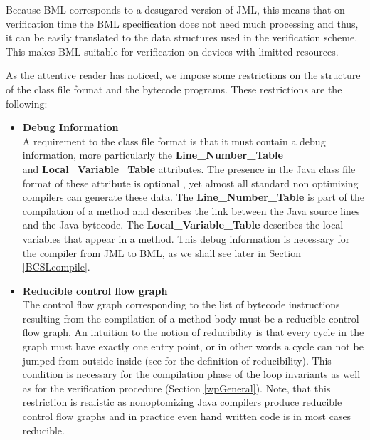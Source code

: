 \begin{itemize}
      Because BML corresponds to a desugared version of JML, this means that on verification time
      the BML specification does not need much processing and thus, it can be easily translated to the
      data structures used in the verification scheme. This makes BML suitable for verification on devices
      with limitted resources.
      
\end{itemize}



As the attentive reader has noticed, we impose some restrictions on the structure of the class file format and the bytecode programs.
These restrictions are the following:
 


\begin{itemize}
  \item \textbf{Debug Information} \\ 
       A requirement to the class file format is that it must contain a debug information, more particularly
       the \textbf{Line\_Number\_Table} \\ 
       and \textbf{Local\_Variable\_Table}  attributes. The presence in the Java class file format of 
       these attribute is optional \cite{VMSpec}, yet almost all standard non optimizing compilers can generate these data. 
       The \textbf{Line\_Number\_Table} is part of the compilation of a method and 
       describes the link between the Java source lines and the Java bytecode.
       The \textbf{Local\_Variable\_Table} describes the local variables that appear in a method.  
       This debug information is necessary for the compiler from JML to BML, as we shall see later in Section \ref{BCSLcompile}.

\item  \textbf{Reducible control flow graph} \\ 
       The control flow graph corresponding to the list of bytecode instructions resulting from the compilation of a method
       body must be a reducible control flow graph. An intuition to the notion of reducibility is that every cycle in the
       graph must have exactly one entry point, 
       or in other words a cycle can not be jumped from outside inside (see \cite{ARUCom1986} for the definition of reducibility). This condition is necessary for the compilation
       phase of the loop  invariants as well as for the verification procedure (Section \ref{wpGeneral}).
       Note, that this restriction is realistic as nonoptomizing Java compilers produce
       reducible control flow graphs and in  practice even hand written code is in most cases reducible. 
\end{itemize}





